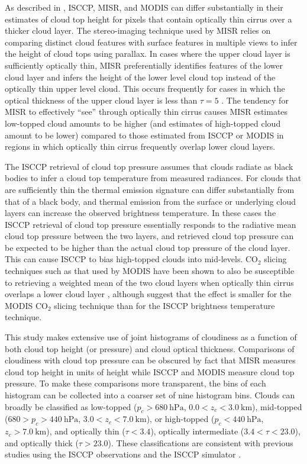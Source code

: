 As described in \cite{marchand_et_al_2010}, ISCCP, MISR, and MODIS can differ substantially in their estimates of cloud top height for pixels that contain optically thin cirrus over a thicker cloud layer. The stereo-imaging technique used by MISR relies on comparing distinct cloud features with surface features in multiple views to infer the height of cloud tops using parallax. In cases where the upper cloud layer is sufficiently optically thin, MISR preferentially identifies features of the lower cloud layer and infers the height of the lower level cloud top instead of the optically thin upper level cloud. This occurs frequently for cases in which the optical thickness of the upper cloud layer is less than $\tau = 5$ \citep{marchand_et_al_2007}. The tendency for MISR to effectively ``see'' through optically thin cirrus causes MISR estimates low-topped cloud amounts to be higher (and estimates of high-topped cloud amount to be lower) compared to those estimated from ISCCP or MODIS in regions in which optically thin cirrus frequently overlap lower cloud layers.

The ISCCP retrieval of cloud top pressure assumes that clouds radiate as black bodies to infer a cloud top temperature from measured radiances. For clouds that are sufficiently thin the thermal emission signature can differ substantially from that of a black body, and thermal emission from the surface or underlying cloud layers can increase the observed brightness temperature. In these cases the ISCCP retrieval of cloud top pressure essentially responds to the radiative mean cloud top pressure between the two layers, and retrieved cloud top pressure can be expected to be higher than the actual cloud top pressure of the cloud layer. This can cause ISCCP to bias high-topped clouds into mid-levels. $\text{CO}_2$ slicing techniques such as that used by MODIS have been shown to also be susceptible to retrieving a weighted mean of the two cloud layers when optically thin cirrus overlaps a lower cloud layer \citep[e.g.,][]{baum_and_wielicki_1994}, although \cite{marchand_et_al_2010} suggest that the effect is smaller for the MODIS $\text{CO}_2$ slicing technique than for the ISCCP brightness temperature technique.

This study makes extensive use of joint histograms of cloudiness as a function of both cloud top height (or pressure) and cloud optical thickness. Comparisons of cloudiness with cloud top pressure can be obscured by fact that MISR measures cloud top height in units of height while ISCCP and MODIS measure cloud top pressure. To make these comparisons more transparent, the bins of each histogram can be collected into a coarser set of nine histogram bins. Clouds can broadly be classified as low-topped ($p_c>680~\text{hPa}$, $0.0<z_c<3.0~\text{km}$), mid-topped ($680>p_c>440~\text{hPa}$, $3.0<z_c<7.0~\text{km}$), or high-topped ($p_c<440~\text{hPa}$, $z_c>7.0~\text{km}$), and optically thin ($\tau<3.4$), optically intermediate ($3.4<\tau<23.0$), and optically thick ($\tau>23.0$). These classifications are consistent with previous studies using the ISCCP observations and the ISCCP simulator \cite[e.g.,][]{zhang_et_al_2005}. 

